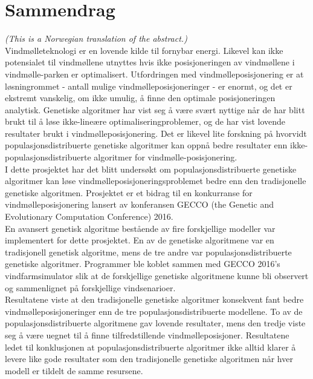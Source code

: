 \section*{Sammendrag}

\noindent \textit{(This is a Norwegian translation of the abstract.)}\\

\noindent Vindmølleteknologi er en lovende kilde til fornybar energi. Likevel kan ikke potensialet til vindmøllene utnyttes hvis ikke posisjoneringen av vindmøllene i vindmølle-parken er optimalisert. Utfordringen med vindmølleposisjonering er at løsningrommet - antall mulige vindmølleposisjoneringer - er enormt, og det er ekstremt vanskelig, om ikke umulig, å finne den optimale posisjoneringen analytisk. Genetiske algoritmer har vist seg å være svært nyttige når de har blitt brukt til å løse ikke-lineære optimaliseringproblemer, og de har vist lovende resultater brukt i vindmølleposisjonering. Det er likevel lite forskning på hvorvidt populasjonsdistribuerte genetiske algoritmer kan oppnå bedre resultater enn ikke-populasjonsdistribuerte algoritmer for vindmølle-posisjonering. \\

\noindent I dette prosjektet har det blitt undersøkt om populasjonsdistribuerte genetiske algoritmer kan løse vindmølleposisjoneringsproblemet bedre enn den tradisjonelle genetiske algoritmen. Prosjektet er et bidrag til en konkurranse for vindmølleposisjonering lansert av konferansen GECCO (the Genetic and Evolutionary Computation Conference) 2016.\\
    
\noindent En avansert genetisk algoritme bestående av fire forskjellige modeller var implementert for dette prosjektet. En av de genetiske algoritmene var en tradisjonell genetisk algoritme, mens de tre andre var populasjonsdistribuerte genetiske algoritmer. Programmer ble koblet sammen med GECCO 2016's vindfarmsimulator slik at de forskjellige genetiske algoritmene kunne bli observert og sammenlignet på forskjellige vindsenarioer.\\
    
\noindent Resultatene viste at den tradisjonelle genetiske algoritmer konsekvent fant bedre vindmølleposisjoneringer enn de tre populasjonsdistribuerte modellene. To av de populasjonsdistribuerte algoritmene gav lovende resultater, mens den tredje viste seg å være uegnet til å finne tilfredstillende vindmølleposisjoner. Resultatene ledet til konklusjonen at populasjonsdistribuerte algoritmer ikke alltid klarer å levere like gode resultater som den tradisjonelle genetiske algoritmen når hver modell er tildelt de samme resursene.\\

\newpage
